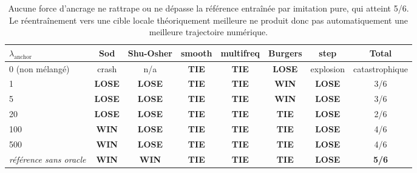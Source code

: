 \documentclass[11pt]{article}
\newcommand{\WIN}{%
    \cellcolor{winbg}\textcolor{wintext}{\textbf{WIN}}%
}
\newcommand{\TIE}{%
    \cellcolor{tiebg}\textcolor{tietext}{\textbf{TIE}}%
}
\newcommand{\LOSE}{%
    \cellcolor{losebg}\textcolor{losetext}{\textbf{LOSE}}%
}
\newcommand{\rowrule}{\specialrule{0.30pt}{0pt}{0pt}}
\begin{document}
\begin{table}[htbp]

\footnotesize

\begin{adjustbox}{max width=\textwidth,center}

\begin{tabular}{lccccccc}

\toprule

\textbf{$\lambda_{\text{anchor}}$}
&
\textbf{Sod}
&
\textbf{Shu-Osher}
&
\textbf{smooth}
&
\textbf{multifreq}
&
\textbf{Burgers}
&
\textbf{step}
&
\textbf{Total}
\\

\midrule

0 (non mélangé)
&
crash
&
n/a
&
\TIE
&
\TIE
&
\LOSE
&
explosion
&
catastrophique
\\

\rowrule

1
&
\LOSE
&
\LOSE
&
\TIE
&
\TIE
&
\WIN
&
\LOSE
&
3/6
\\

\rowrule

5
&
\LOSE
&
\LOSE
&
\TIE
&
\TIE
&
\WIN
&
\LOSE
&
3/6
\\

\rowrule

20
&
\LOSE
&
\LOSE
&
\TIE
&
\TIE
&
\TIE
&
\LOSE
&
2/6
\\

\rowrule

100
&
\WIN
&
\LOSE
&
\TIE
&
\TIE
&
\TIE
&
\LOSE
&
4/6
\\

\rowrule

500
&
\WIN
&
\LOSE
&
\TIE
&
\TIE
&
\TIE
&
\LOSE
&
4/6
\\

\midrule

\emph{référence sans oracle}
&
\WIN
&
\WIN
&
\TIE
&
\TIE
&
\TIE
&
\LOSE
&
\textbf{5/6}
\\

\bottomrule

\end{tabular}

\end{adjustbox}

\caption{
Aucune force d'ancrage ne rattrape ou ne dépasse la référence entraînée
par imitation pure, qui atteint 5/6.
Le réentraînement vers une cible locale théoriquement meilleure ne produit
donc pas automatiquement une meilleure trajectoire numérique.
}

\end{table}
\end{document}
